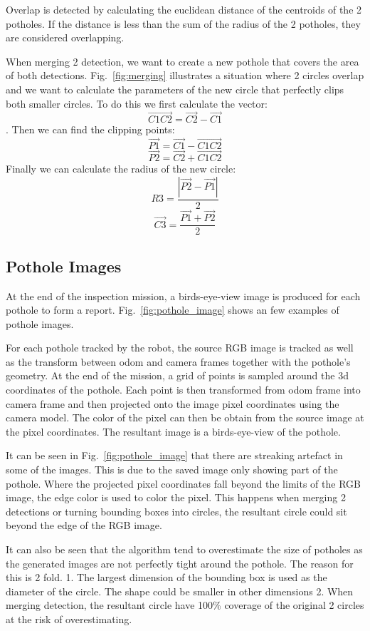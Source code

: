 \documentclass[conference]{IEEEtran}
\begin{document}
Overlap is detected by calculating the euclidean distance of the centroids of the 2 potholes. If the distance is less than the sum of the radius of the 2 potholes, they are considered overlapping.

When merging 2 detection, we want to create a new pothole that covers the area of both detections. Fig.~\ref{fig:merging} illustrates a situation where 2 circles overlap and we want to calculate the parameters of the new circle that perfectly clips both smaller circles. To do this we first calculate the vector:
 \[\overrightarrow{C1C2} = \overrightarrow{C2} - \overrightarrow{C1}\].
Then we can find the clipping points:
\[\overrightarrow{P1} = \overrightarrow{C1} - \overrightarrow{C1C2}\]
\[\overrightarrow{P2} = \overrightarrow{C2} + \overrightarrow{C1C2}\]
Finally we can calculate the radius of the new circle:
\[R3 = \frac{|\overrightarrow{P2} - \overrightarrow{P1}|}{2}\]
\[\overrightarrow{C3} = \frac{\overrightarrow{P1} + \overrightarrow{P2}}{2}\]

\subsection{Pothole Images}

At the end of the inspection mission, a birds-eye-view image is produced for each pothole to form a report. Fig.~\ref{fig:pothole_image} shows an few examples of pothole images.

For each pothole tracked by the robot, the source RGB image is tracked as well as the transform between odom and camera frames together with the pothole's geometry. At the end of the mission, a grid of points is sampled around the 3d coordinates of the pothole. Each point is then transformed from odom frame into camera frame and then projected onto the image pixel coordinates using the camera model. The color of the pixel can then be obtain from the source image at the pixel coordinates. The resultant image is a birds-eye-view of the pothole.

It can be seen in Fig.~\ref{fig:pothole_image} that there are streaking artefact in some of the images. This is due to the saved image only showing part of the pothole. Where the projected pixel coordinates fall beyond the limits of the RGB image, the edge color is used to color the pixel. This happens when merging 2 detections or turning bounding boxes into circles, the resultant circle could sit beyond the edge of the RGB image.

It can also be seen that the algorithm tend to overestimate the size of potholes as the generated images are not perfectly tight around the pothole. The reason for this is 2 fold. 1. The largest dimension of the bounding box is used as the diameter of the circle. The shape could be smaller in other dimensions 2. When merging detection, the resultant circle have 100\% coverage of the original 2 circles at the risk of overestimating.
\end{document}
